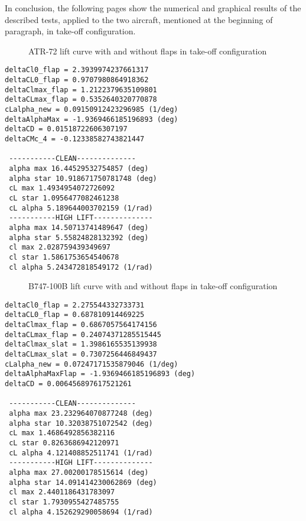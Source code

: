\bigskip
\noindent
In conclusion, the following pages show the numerical and graphical results of the described tests, applied to the two aircraft, mentioned at the beginning of paragraph, in take-off configuration.

\begin{figure}[H]
\centering

\caption{ATR-72 lift curve with and without flaps in take-off configuration}
\label{fig:FlapATR}
\end{figure}

\bigskip
\lstset{language=Java}
\begin{lstlisting}[caption={ATR-72 test results}, captionpos=b, tabsize=2]
deltaCl0_flap = 2.3939974237661317
deltaCL0_flap = 0.9707980864918362
deltaClmax_flap = 1.2122379635109801
deltaCLmax_flap = 0.5352640320770878
cLalpha_new = 0.09150912423296985 (1/deg)
deltaAlphaMax = -1.9369466185196893 (deg)
deltaCD = 0.01518722606307197
deltaCMc_4 = -0.12338582743821447

 -----------CLEAN-------------- 
 alpha max 16.44529532754857 (deg)
 alpha star 10.918671750781748 (deg)
 cL max 1.4934954072726092
 cL star 1.0956477082461238
 cL alpha 5.189644003702159 (1/rad)
 -----------HIGH LIFT-------------- 
 alpha max 14.50713741489647 (deg)
 alpha star 5.55824828132392 (deg)
 cl max 2.028759439349697
 cl star 1.5861753654540678
 cl alpha 5.243472818549172 (1/rad)
\end{lstlisting}

\begin{figure}[H]
\centering

\caption{B747-100B lift curve with and without flaps in take-off configuration}
\label{fig:FlapATR}
\end{figure}

\bigskip
\lstset{language=Java}
\begin{lstlisting}[caption={B747-100B test results}, captionpos=b, tabsize=2]
deltaCl0_flap = 2.275544332733731
deltaCL0_flap = 0.687810914469225
deltaClmax_flap = 0.6867057564174156
deltaCLmax_flap = 0.24074371285515445
deltaClmax_slat = 1.3986165535139938
deltaCLmax_slat = 0.7307256446849437
cLalpha_new = 0.07247171535879046 (1/deg)
deltaAlphaMaxFlap = -1.9369466185196893 (deg)
deltaCD = 0.006456897617521261

 -----------CLEAN-------------- 
 alpha max 23.232964070877248 (deg)
 alpha star 10.32038751072542 (deg)
 cL max 1.4686492856382116
 cL star 0.8263686942120971
 cL alpha 4.121408852511741 (1/rad)
 -----------HIGH LIFT-------------- 
 alpha max 27.00200178515614 (deg)
 alpha star 14.091414230062869 (deg)
 cl max 2.4401186431783097
 cl star 1.7930955427485755
 cl alpha 4.152629290058694 (1/rad)
\end{lstlisting}